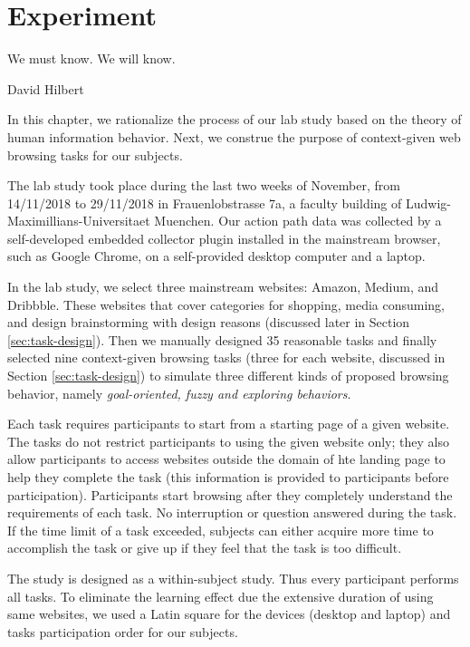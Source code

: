 \section{Experiment}
\label{ch:exp}

\epigraph{We must know. We will know.}{David Hilbert}

In this chapter, we rationalize the process of our lab study based on the theory of
human information behavior. Next, we construe the purpose of context-given web browsing tasks 
for our subjects.

The lab study took place during the last two weeks of November, from 14/11/2018 to 29/11/2018
in Frauenlobstrasse 7a, a faculty building of Ludwig-Maximillians-Universitaet Muenchen.
Our action path data was collected by a self-developed embedded collector plugin installed in 
the mainstream browser, such as Google Chrome, on a self-provided desktop computer and a laptop.

In the lab study, we select three mainstream websites: Amazon, Medium, and Dribbble. 
These websites that cover categories for shopping, media consuming, and design brainstorming 
with design reasons (discussed later in Section \ref{sec:task-design}).
Then we manually designed 35 reasonable tasks and finally selected nine 
context-given browsing tasks (three for each website, discussed in 
Section \ref{sec:task-design}) to simulate three different kinds of proposed browsing behavior,
namely \emph{goal-oriented, fuzzy and exploring behaviors}.

Each task requires participants to start from a starting page of a given website. 
The tasks do not restrict participants to using the given website only; they also allow
participants to access websites outside the domain of hte landing page to help 
they complete the task 
(this information is provided to participants before participation).
Participants start browsing after they completely understand the requirements of 
each task. No interruption or question answered during the task.
If the time limit of a task exceeded, subjects can either acquire more time 
to accomplish the task or give up if they feel that the task is too difficult.

The study is designed as a within-subject study. Thus every participant performs all tasks. 
To eliminate the learning effect due the extensive duration of using same websites, 
we used a Latin square \cite{cochran1950experimental} 
for the devices (desktop and laptop) and tasks participation order for our subjects.

